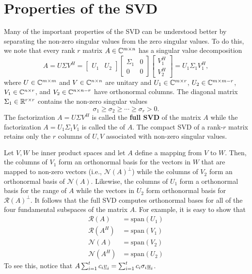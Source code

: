 \section{Properties of the SVD}

Many of the important properties of the SVD can be understood better by separating the non-zero singular values from the zero singular values.
To do this, we note that every rank $r$ matrix $A \in \mathbb{C}^{m \times n}$ has a singular value decomposition
\begin{equation*}
A = U \Sigma V^H
= \left[ \begin{array}{cc} U_1 & U_2 \end{array} \right]
\left[ \begin{array}{cc} \Sigma_1 & 0 \\ 0 & 0 \end{array} \right]
\left[ \begin{array}{c} V_1^H \\ V_2^H \end{array} \right]
= U_1 \Sigma_1 V_1^H,
\end{equation*}
where $U \in \mathbb{C}^{m \times m}$ and $V \in \mathbb{C}^{n \times n}$ are unitary and $U_1 \in \mathbb{C}^{m \times r}$, $U_2 \in \mathbb{C}^{m \times m-r}$, $V_1 \in \mathbb{C}^{n \times r}$, and $V_2 \in \mathbb{C}^{n \times n-r}$ have orthonormal columns.
The diagonal matrix $\Sigma_1 \in \mathbb{R}^{r \times r}$ contains the non-zero singular values
\[ \sigma_1 \geq \sigma_2 \geq \cdots \geq \sigma_r > 0. \]
The factorization $A = U \Sigma V^H$ is called the \textbf{full SVD} of the matrix $A$ while the factorization $A = U_1 \Sigma_1 V_1$ is called the  of $A$.
The compact SVD of a rank-$r$ matrix retains only the $r$ columns of $U,V$ associated with non-zero singular values.

Let $V,W$ be inner product spaces and let $A$ define a mapping from $V$ to $W$.
Then, the columns of $V_1$ form an orthonormal basis for the vectors in $W$ that are mapped to non-zero vectors (i.e., $\mathcal{N}(A)^\bot$) while the columns of $V_2$ form an orthonormal basis of $\mathcal{N}(A)$.
Likewise, the columns of $U_1$ form a orthonormal basis for the range of $A$ while the vectors in $U_2$ form orthonormal basis for $\mathcal{R}(A)^\bot$.
It follows that the full SVD computes orthonormal bases for all of the four fundamental subspaces of the matrix $A$.
For example, it is easy to show that
\begin{align*}
\mathcal{R}(A) &= \textrm{span} (U_1) \\
\mathcal{R}(A^H) &= \textrm{span} (V_1) \\
\mathcal{N}(A) &= \textrm{span} (V_2) \\
\mathcal{N}(A^H) &= \textrm{span} (U_2)
\end{align*}
To see this, notice that $A \sum_{i=1}^t c_i \underline{v}_i = \sum_{i=1}^t c_i \sigma_i \underline{u}_i$.

